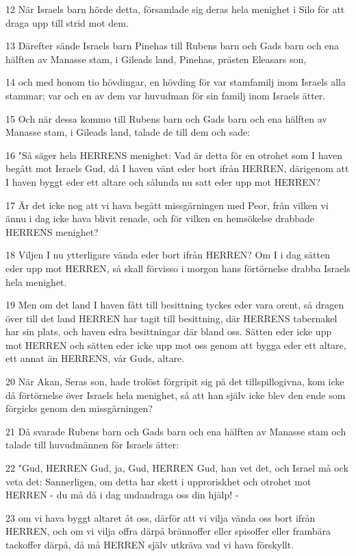 \par 12 När Israels barn hörde detta, församlade sig deras hela menighet i Silo för att draga upp till strid mot dem.
\par 13 Därefter sände Israels barn Pinehas till Rubens barn och Gads barn och ena hälften av Manasse stam, i Gileads land, Pinehas, prästen Eleasars son,
\par 14 och med honom tio hövdingar, en hövding för var stamfamilj inom Israels alla stammar; var och en av dem var huvudman för sin familj inom Israels ätter.
\par 15 Och när dessa kommo till Rubens barn och Gads barn och ena hälften av Manasse stam, i Gileads land, talade de till dem och sade:
\par 16 "Så säger hela HERRENS menighet: Vad är detta för en otrohet som I haven begått mot Israels Gud, då I haven vänt eder bort ifrån HERREN, därigenom att I haven byggt eder ett altare och sålunda nu satt eder upp mot HERREN?
\par 17 Är det icke nog att vi hava begått missgärningen med Peor, från vilken vi ännu i dag icke hava blivit renade, och för vilken en hemsökelse drabbade HERRENS menighet?
\par 18 Viljen I nu ytterligare vända eder bort ifrån HERREN? Om I i dag sätten eder upp mot HERREN, så skall förvisso i morgon hans förtörnelse drabba Israels hela menighet.
\par 19 Men om det land I haven fått till besittning tyckes eder vara orent, så dragen över till det land HERREN har tagit till besittning, där HERRENS tabernakel har sin plats, och haven edra besittningar där bland oss. Sätten eder icke upp mot HERREN och sätten eder icke upp mot oss genom att bygga eder ett altare, ett annat än HERRENS, vår Guds, altare.
\par 20 När Akan, Seras son, hade trolöst förgripit sig på det tillspillogivna, kom icke då förtörnelse över Israels hela menighet, så att han själv icke blev den ende som förgicks genom den missgärningen?
\par 21 Då svarade Rubens barn och Gads barn och ena hälften av Manasse stam och talade till huvudmännen för Israels ätter:
\par 22 "Gud, HERREN Gud, ja, Gud, HERREN Gud, han vet det, och Israel må ock veta det: Sannerligen, om detta har skett i upproriskhet och otrohet mot HERREN - du må då i dag undandraga oss din hjälp! -
\par 23 om vi hava byggt altaret åt oss, därför att vi vilja vända oss bort ifrån HERREN, och om vi vilja offra därpå brännoffer eller spisoffer eller frambära tackoffer därpå, då må HERREN själv utkräva vad vi hava förskyllt.
